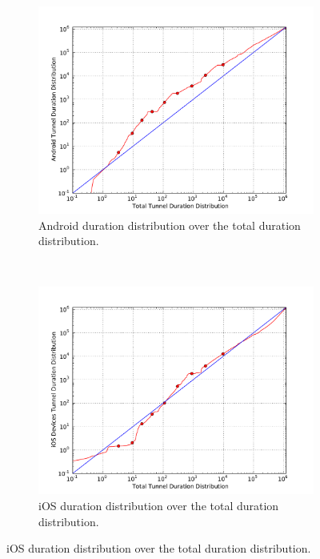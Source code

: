 \begin{figure}
        \centering
        \begin{subfigure}[b]{0.50\textwidth}
                \centering
                \includegraphics[width=\textwidth]{images/CONEXT2012/qq-total-vs-android.pdf}
                \caption{Android duration distribution over the total duration distribution.}
                \label{fig:qq-total-vs-android}
        \end{subfigure}%
        ~
        \begin{subfigure}[b]{0.50\textwidth}
                        \centering
                \includegraphics[width=\textwidth]{images/CONEXT2012/qq-total-vs-ios.pdf}
                \caption{iOS duration distribution over the total duration distribution.}
                \label{fig:qq-total-vs-ios}
        \end{subfigure}


\end{figure}

